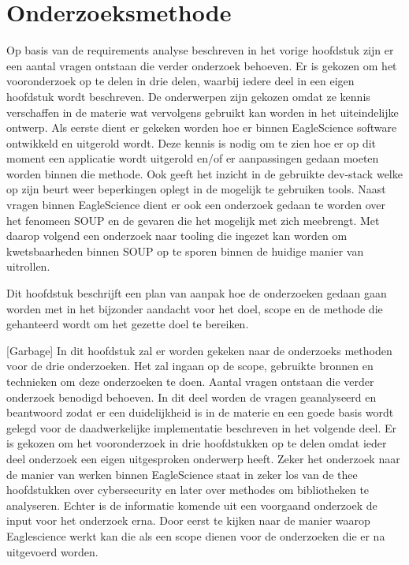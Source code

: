 \chapter{Onderzoeksmethode}\label{ch:onderzoeksmethode} %

Op basis van de requirements analyse beschreven in het vorige hoofdstuk zijn er een aantal vragen ontstaan die verder onderzoek behoeven. Er is gekozen om het vooronderzoek op te delen in drie delen, waarbij iedere deel in een eigen hoofdstuk wordt beschreven. De onderwerpen zijn gekozen omdat ze kennis verschaffen in de materie wat vervolgens gebruikt kan worden in het uiteindelijke ontwerp.
Als eerste dient er gekeken worden hoe er binnen EagleScience software ontwikkeld en uitgerold wordt. Deze kennis is nodig om te zien hoe er op dit moment een applicatie wordt uitgerold en/of er aanpassingen gedaan moeten worden binnen die methode. Ook geeft het inzicht in de gebruikte dev-stack welke op zijn beurt weer beperkingen oplegt in de mogelijk te gebruiken tools. Naast vragen binnen EagleScience dient er ook een onderzoek gedaan te worden over het fenomeen SOUP en de gevaren die het mogelijk met zich meebrengt. Met daarop volgend een onderzoek naar tooling die ingezet kan worden om kwetsbaarheden binnen SOUP op te sporen binnen de huidige manier van uitrollen.

Dit hoofdstuk beschrijft een plan van aanpak hoe de onderzoeken gedaan gaan worden met in het bijzonder aandacht voor het doel, scope en de methode die gehanteerd wordt om het gezette doel te bereiken.

[Garbage]
In dit hoofdstuk zal er worden gekeken naar de onderzoeks methoden voor de drie onderzoeken. Het zal ingaan op de scope, gebruikte bronnen en technieken om deze onderzoeken te doen.
Aantal vragen ontstaan die verder onderzoek benodigd behoeven. In dit deel worden de vragen geanalyseerd en beantwoord zodat er een duidelijkheid is in de materie en een goede basis wordt gelegd voor de daadwerkelijke implementatie beschreven in het volgende deel. Er is gekozen om het vooronderzoek in drie hoofdstukken op te delen omdat ieder deel onderzoek een eigen uitgesproken onderwerp heeft. Zeker het onderzoek naar de manier van werken binnen EagleScience staat in zeker los van de thee hoofdstukken over cybersecurity en later over methodes om bibliotheken te analyseren. Echter is de informatie komende uit een voorgaand onderzoek de input voor het onderzoek erna. Door eerst te kijken naar de manier waarop Eaglescience werkt kan die als een scope dienen voor de onderzoeken die er na uitgevoerd worden.

